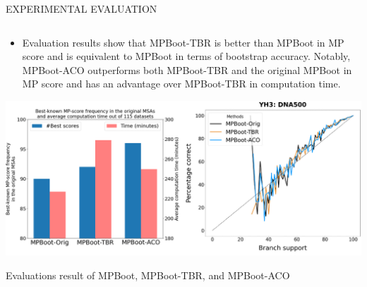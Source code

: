 \documentclass[%
  final,%
  english,%
]{beamer}
\begin{document}
\begin{frame}[t, fragile = singleslide]
\begin{columns}[t, onlytextwidth]
\begin{column}{\textwidth}
\begin{block}{EXPERIMENTAL EVALUATION}
\begin{columns}
\begin{column}{0.45\textwidth}
\begin{itemize}
    \item Evaluation results show that MPBoot-TBR is better than MPBoot in MP score and is equivalent to MPBoot in terms of bootstrap accuracy. Notably, MPBoot-ACO outperforms both MPBoot-TBR and the original MPBoot in MP score and has an advantage over MPBoot-TBR in computation time.
\end{itemize}
\vspace{0.7cm}
\begin{table}
\centering%
\includegraphics[width = 1\columnwidth]{./Figuras/results.png}
\caption{Evaluations result of MPBoot, MPBoot-TBR, and MPBoot-ACO}
\end{table}
\end{column}

\end{columns}
\end{block}
%
\end{column}
%
\end{columns}


\end{frame}
\end{document}
